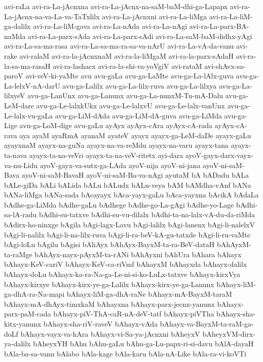 {avi-raLa
avi-ra-La-jAcnxna
avi-ra-La-jAcnx-na-saM-baM-dhi-ga-Lapapx
avi-ra-La-jAcnx-na-va-La-va-TaTxlilx
avi-ra-La-jAcnxni
avi-ra-La-liMga
avi-ra-La-liM-ga-dalilx
avi-ra-La-liM-gava
avi-ra-La-nAda
avi-ra-La-nAgi
avi-ra-La-parx-BA-naMda
avi-ra-La-parx-sAda
avi-ra-La-parx-sAdi
avi-ra-La-saM-baM-didhx-yAgi
avi-ra-La-sa-ma-rasa
avi-ra-La-sa-ma-ra-sa-va-nArU
avi-ra-La-vA-da-vanu
avi-rake
avi-ralaM
avi-ra-la-jAcnxnaM
avi-ra-la-liMgaM
avi-ra-la-parx-sAdaH
avi-ra-la-sa-ma-rasaH
avi-ra-lashacx
avi-ra-la-shi-va-yoVgiV
avi-rataM
avi-shAvx-sa-paroV
avi-veV-ki-yaMte
avu
avu-gaLa
avu-ga-LaMte
avu-ga-La-lAlx-guva
avu-ga-La-lelxV-nA-darU
avu-ga-Lalilx
avu-ga-La-lilx-ruva
avu-ga-La-lilxya
avu-ga-La-lilxyeV
avu-ga-LanUnx
avu-ga-Lanunx
avu-ga-La-nunxM-Tu-mA-Dalu
avu-ga-LeM-dare
avu-ga-Le-lalxkUkx
avu-ga-Le-lalxvU
avu-ga-Le-lalx-vanUnx
avu-ga-Le-lalx-vu-gaLa
avu-ga-LiM-dAda
avu-ga-LiM-dA-guva
avu-ga-LiMda
avu-ga-Lige
avu-ga-LoM-dige
avu-gaLu
ayAyx
ayAyx-cAra
ayAyx-cA-rada
ayAyx-cA-rava
aya
ayaM
ayaRmA
ayanaM
ayateV
ayayx
ayayx-ga-LeM-daDe
ayayx-gaLu
ayayxnaM
ayayx-na-guNa
ayayx-na-va-reMdu
ayayx-na-varu
ayayx-tana
ayayx-ta-nava
ayayx-ta-na-veVri
ayayx-ta-na-veV-ritetx
ayi-dara
ayoV-gayx-darx-vayx-va-nu-Lidu
ayoV-gayx-va-sutx-ga-LAda
ayoV-nija
ayoV-ni-jana
ayoV-ni-saM-Bava
ayoV-ni-saM-BavaH
ayoV-ni-saM-Ba-va-nAgi
ayutaM
bA
bADadu
bALa
bALe-giDa
bALi
bALida
bALu
bALudx
bALu-veya
bAM
bAMdha-vAnf
bANa
bANa-liMga
bANa-sada
bAcayayx
bAca-yayx-gaLu
bAca-yayxna
bAcikA
bAdaLa
bAdhe-ga-LiMda
bAdhe-gaLu
bAdhege
bAdhe-go-La-gAgi
bAdhe-yo-Lage
bAdhi-sa-lA-radu
bAdhi-su-tatxve
bAdhi-su-vu-dilalx
bAdhi-ta-na-lalx-vA-du-da-riMda
bAdirx-ho-ninxge
bAgila
bAgi-lagx-Lavu
bAgi-lalilx
bAgi-lanenx
bAgi-li-nalelxV
bAgi-li-nalilx
bAgi-li-na-lilx-ruva
bAgi-li-ra-beV-kA-gu-tatxde
bAgi-li-ru-vaMte
bAgi-loLu
bAgilu
bAgisi
bAhAyx
bAhAyx-BayxM-ta-ra-BeV-dataH
bAhAyxM-ta-raMge
bAhAyx-nayx-pAyxM-ta-rANi
bAhAyxni
bAhUra
bAhara
bAhayx
bAhayx-KeV-cariV
bAhayx-KeV-ca-riVmf
bAhayxM
bAhayxda
bAhayx-dalilx
bAhayx-doLu
bAhayx-ka-ra-Na-ga-Le-ni-si-ko-LuLx-tatxve
bAhayx-kirxVya
bAhayx-kirxye
bAhayx-kirx-ye-ga-Lalilx
bAhayx-kirx-ye-ga-Lanunx
bAhayx-liM-ga-dhA-ra-Na-mapi
bAhayx-liM-ga-dhA-raNe
bAhayx-mA-BayxM-taraM
bAhayx-mA-dhAyx-timxkaM
bAhayxna
bAhayx-parx-jecnx-yanunx
bAhayx-parx-paM-cada
bAhayx-piV-ThA-caR-nA-deV-tatf
bAhayx-piVTha
bAhayx-sha-kitx-yanunx
bAhayx-sha-riV-raveV
bAhayx-vAda
bAhayx-va-BayxM-ta-raM-ga-doLf
bAhayx-vayx-va-hAra
bAhayx-vi-Sa-ya-jAcnxni
bAheyxV
bAheyxVM-dirx-ya-dalilx
bAheyxYH
bAhu
bAhu-gaLu
bAhu-ga-Lu-papx-ri-si-davu
bAlA-dayaH
bAla-ba-sa-vanu
bAlabo
bAla-kage
bAla-karu
bAla-nA-Like
bAla-ra-vi-koVTi
}
